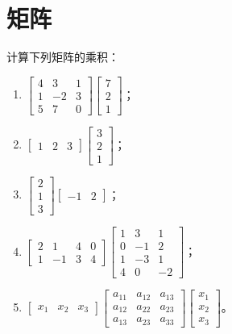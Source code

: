 \section{矩阵}

\begin{problem}\label{problem-1.1}
计算下列矩阵的乘积：

\begin{enumerate}
    \item \(\begin{bmatrix}
              4 & 3 & 1 \\1&-2&3\\5&7&0
          \end{bmatrix}\begin{bmatrix}
              7 \\2\\1
          \end{bmatrix}\)；
    \item \(\begin{bmatrix}1&2&3\end{bmatrix}\begin{bmatrix}3\\2\\1\end{bmatrix}\)；
    \item \(\begin{bmatrix}2\\1\\3\end{bmatrix}\begin{bmatrix}-1&2\end{bmatrix}\)；
    \item \(\begin{bmatrix}
              2 & 1  & 4 & 0 \\
              1 & -1 & 3 & 4
          \end{bmatrix}\begin{bmatrix}
              1 & 3  & 1  \\
              0 & -1 & 2  \\
              1 & -3 & 1  \\
              4 & 0  & -2
          \end{bmatrix}\)；
    \item \(\begin{bmatrix}
              x_1 & x_2 & x_3
          \end{bmatrix}
          \begin{bmatrix}
              a_{11} & a_{12} & a_{13} \\
              a_{12} & a_{22} & a_{23} \\
              a_{13} & a_{23} & a_{33}
          \end{bmatrix}
          \begin{bmatrix}
              x_1 \\x_2\\x_3
          \end{bmatrix}\)。
\end{enumerate}
\end{problem}
